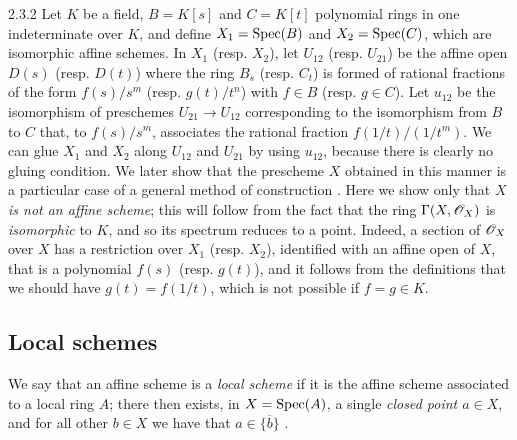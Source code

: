 \begin{env}[Example]{2.3.2}
\label{1.2.3.2}
Let $K$ be a field, $B=K[s]$ and $C=K[t]$ polynomial rings in one indeterminate over $K$, and define $X_1={\mathop{\mathrm{Spec}}\nolimits}(B)$ and $X_2={\mathop{\mathrm{Spec}}\nolimits}(C)$, which are isomorphic affine schemes.
In $X_1$ (resp. $X_2$), let $U_{12}$ (resp. $U_{21}$) be the affine open $D(s)$ (resp. $D(t)$) where the ring $B_s$ (resp. $C_t$) is formed of rational fractions of the form $f(s)/s^m$ (resp. $g(t)/t^n$) with $f\in B$ (resp. $g\in C$).
Let $u_{12}$ be the isomorphism of preschemes $U_{21}\to U_{12}$ corresponding  to the isomorphism from $B$ to $C$ that, to $f(s)/s^m$, associates the rational fraction $f(1/t)/(1/t^m)$.
We can glue $X_1$ and $X_2$ along $U_{12}$ and $U_{21}$ by using $u_{12}$, because there is clearly no gluing condition.
We later show that the prescheme $X$ obtained in this manner is a particular case of a general method of construction .
Here we show only that $X$ \emph{is not an affine scheme};
this will follow from the fact that the ring $\Gamma(X,\mathscr{O}_X)$ is \emph{isomorphic} to $K$, and so its spectrum reduces to a point.
Indeed, a section of $\mathscr{O}_X$ over $X$ has a restriction over $X_1$ (resp. $X_2$), identified with an affine open of $X$, that is a polynomial $f(s)$ (resp. $g(t)$), and it follows from the definitions that we should have $g(t)=f(1/t)$, which is not possible if $f=g\in K$.
\end{env}

\subsection{Local schemes}
\label{subsection-local-schemes}

\begin{env}[2.4.1]
\label{1.2.4.1}
We say that an affine scheme is a \emph{local scheme} if it is the affine scheme associated to a local ring $A$;
there then exists, in $X={\mathop{\mathrm{Spec}}\nolimits}(A)$, a single \emph{closed point $a\in X$}, and for all other $b\in X$ we have that $a\in\overline{\{b\}}$ .
\end{env}

